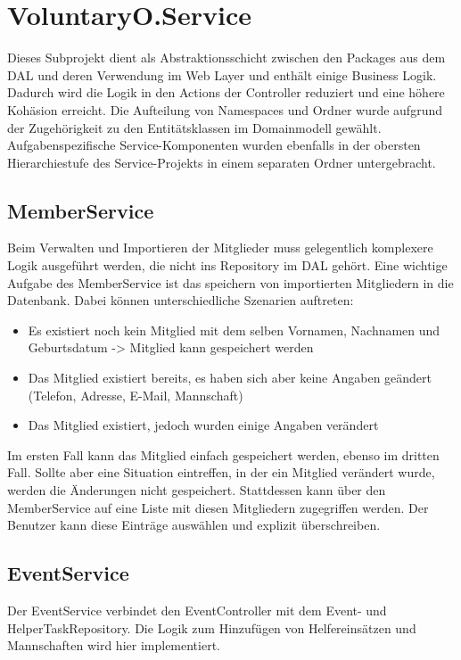 \newpage
\section{VoluntaryO.Service}
	Dieses Subprojekt dient als Abstraktionsschicht zwischen den Packages aus dem DAL und deren Verwendung im Web Layer und enthält einige Business Logik. Dadurch wird die Logik in den Actions der Controller reduziert und eine höhere Kohäsion erreicht. Die Aufteilung  von Namespaces und Ordner wurde aufgrund der Zugehörigkeit zu den Entitätsklassen im Domainmodell gewählt. Aufgabenspezifische Service-Komponenten wurden ebenfalls in der obersten Hierarchiestufe des Service-Projekts in einem separaten Ordner untergebracht.
	
	
	\subsection{MemberService}	
		Beim Verwalten und Importieren der Mitglieder muss gelegentlich komplexere Logik ausgeführt werden, die nicht ins Repository im DAL gehört.
		Eine wichtige Aufgabe des MemberService ist das speichern von importierten Mitgliedern in die Datenbank. Dabei können unterschiedliche Szenarien auftreten:
		\\\begin{itemize}	
			\item Es existiert noch kein Mitglied mit dem selben Vornamen, Nachnamen und Geburtsdatum -> Mitglied kann gespeichert werden
			\item Das Mitglied existiert bereits, es haben sich aber keine Angaben geändert (Telefon, Adresse, E-Mail, Mannschaft)
			\item Das Mitglied existiert, jedoch wurden einige Angaben verändert\\
		\end{itemize}
		
		\noindent	
		Im ersten Fall kann das Mitglied einfach gespeichert werden, ebenso im dritten Fall. Sollte aber eine Situation eintreffen, in der ein Mitglied verändert wurde, werden die Änderungen nicht gespeichert. Stattdessen kann über den MemberService auf eine Liste mit diesen Mitgliedern zugegriffen werden. Der Benutzer kann diese Einträge auswählen und explizit überschreiben.
	
	
	\subsection{EventService}
		Der EventService verbindet den EventController mit dem Event- und HelperTaskRepository. Die Logik zum Hinzufügen von Helfereinsätzen und Mannschaften wird hier implementiert.
	
